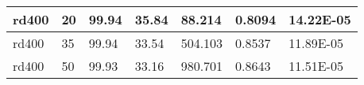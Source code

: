 \documentclass{llncs}
\begin{document}
\begin{center}
\begin{longtable}{|l|l|l|l|l|l|l|}
\hline	rd400	&	20	&	99.94	&	35.84	&	88.214	&	0.8094	&	14.22E-05	\\
\hline	rd400	&	35	&	99.94	&	33.54	&	504.103	&	0.8537	&	11.89E-05	\\
\hline	rd400	&	50	&	99.93	&	33.16	&	980.701	&	0.8643	&	11.51E-05	\\
\hline
\end{longtable}
\end{center}
\end{document}
